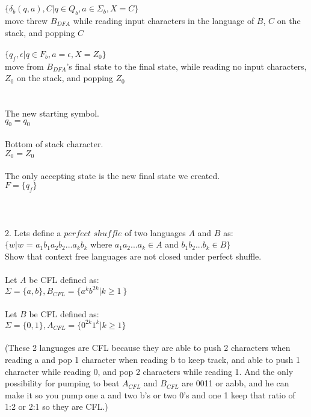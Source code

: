 \documentclass[11pt, oneside]{article}   	%
\begin{document}
\\
\\$\{\delta_b(q,a), C | q \in Q_b, a \in \Sigma_b, X = C\}$
\\move threw $B_{DFA}$ while reading input characters in the language of $B$, $C$ on the stack, and popping $C$
\\
\\$\{q_f,\epsilon | q \in F_b, a = \epsilon, X = Z_0\}$ 
\\move from $B_{DFA}$'s final state to the final state, while reading no input characters, $Z_0$ on the stack, and popping $Z_0$
\\
\\
\\The new starting symbol.
\\$q_0 = q_0$
\\
\\Bottom of stack character.
\\$Z_0 = Z_0$
\\
\\The only accepting state is the new final state we created.
\\$F = \{q_f\}$
\\
\\
\\
\\2. Lets define a $perfect$ $shuffle$ of two languages $A$ and $B$ as:
\\$\{ w | w$ = $a_1b_1a_2b_2 ... a_kb_k$ where $a_1a_2 ... a_k \in A$ and $b_1b_2 ... b_k \in B \}$
\\Show that context free languages are not closed under perfect shuffle.
\\
\\Let $A$ be CFL defined as:
\\$\Sigma = \{a,b\}, B_{CFL} = \{ a^kb^{2k} | k \geq 1\ \}$
\\
\\Let $B$ be CFL defined as:
\\$\Sigma = \{0,1\}, A_{CFL} = \{ 0^{2k}1^k | k \geq 1\}$
\\
\\(These 2 languages are CFL because they are able to push 2 characters when reading a and pop 1 character when reading b to keep track, and able to push 1 character while reading 0, and pop 2 characters while reading 1. And the only possibility for pumping to beat $A_{CFL}$ and $B_{CFL}$ are 0011 or aabb, and he can make it so you pump one a and two b's or two 0's and one 1 keep that ratio of 1:2 or 2:1 so they are CFL.)
\end{document}
